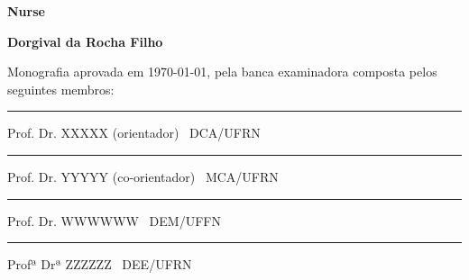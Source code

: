 %
%

\begin{titlepage}

\begin{center}

\LARGE

\textbf{Nurse}

\vfill

\Large

\textbf{Dorgival da Rocha Filho}

\end{center}

\vfill

\noindent
Monografia aprovada em \today, pela banca examinadora composta
pelos seguintes membros:


\begin{center}

\vspace{1.5cm}\rule{0.95\linewidth}{1pt}
\parbox{0.9\linewidth}{%
Prof. Dr. XXXXX (orientador) \dotfill\ DCA/UFRN}

\vspace{1.5cm}\rule{0.95\linewidth}{1pt}
\parbox{0.9\linewidth}{%
Prof. Dr. YYYYY (co-orientador) \dotfill\ MCA/UFRN}

\vspace{1.5cm}\rule{0.95\linewidth}{1pt}
\parbox{0.9\linewidth}{%
Prof. Dr. WWWWWW \dotfill\ DEM/UFFN}

\vspace{1.5cm}\rule{0.95\linewidth}{1pt}
\parbox{0.9\linewidth}{%
Profª Drª ZZZZZZ \dotfill\ DEE/UFRN}

\end{center}

\end{titlepage}

%
%


